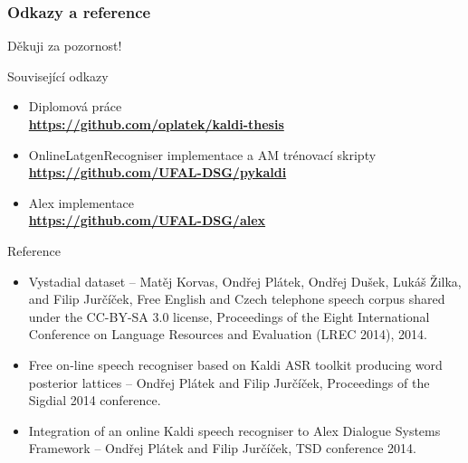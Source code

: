 \begin{frame}\frametitle{Odkazy a reference}
    Děkuji za pozornost! \\
    \begin{exampleblock}{Související odkazy}
        \begin{itemize}
            \item Diplomová práce \\ {\bf \url{https://github.com/oplatek/kaldi-thesis}}
            \item OnlineLatgenRecogniser implementace a AM trénovací skripty \\ {\bf \url{https://github.com/UFAL-DSG/pykaldi}} 
            \item Alex implementace \\ {\bf \url{https://github.com/UFAL-DSG/alex}} 
        \end{itemize}
    \end{exampleblock}
    \begin{exampleblock}{Reference}
        \tiny
        \begin{itemize}
            \item Vystadial dataset --  Matěj Korvas, Ondřej Plátek, Ondřej Dušek, Lukáš Žilka, and Filip Jurčíček, Free English and Czech telephone speech corpus shared under the CC-BY-SA 3.0 license, Proceedings of the Eight International Conference on Language Resources and Evaluation (LREC 2014), 2014.
            \item Free on-line speech recogniser based on Kaldi ASR toolkit producing word posterior lattices -- Ondřej Plátek and Filip Jurčíček, Proceedings of the Sigdial 2014 conference.
            \item Integration of an online Kaldi speech recogniser to Alex Dialogue Systems Framework -- Ondřej Plátek and Filip Jurčíček, TSD conference 2014.
        \end{itemize}
    \end{exampleblock}
\end{frame}

